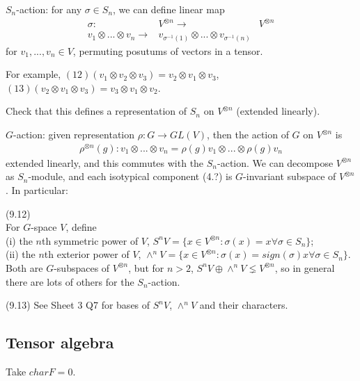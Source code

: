 \documentclass[a4paper]{article}
\begin{document}
$S_n$-action: for any $\sigma \in S_n$, we can define linear map
\begin{equation*}
\begin{aligned}
\sigma: &V^{\otimes n} \to &V^{\otimes n}\\
v_1 \otimes ... \otimes v_n \to &v_{\sigma^{-1}(1)} \otimes ... \otimes v_{\sigma^{-1}(n)}
\end{aligned}
\end{equation*}
for $v_1,...,v_n \in V$, permuting posutums of vectors in a tensor.

For example, $(12)(v_1\otimes v_2 \otimes v_3) = v_2 \otimes v_1 \otimes v_3$, $(13)(v_2 \otimes v_1 \otimes v_3) = v_3 \otimes v_1 \otimes v_2$.

Check that this defines a representation of $S_n$ on $V^{\otimes n}$ (extended linearly).

$G$-action: given representation $\rho:G \to GL(V)$, then the action of $G$ on $V^{\otimes n}$ is
\begin{equation*}
\begin{aligned}
\rho^{\otimes n} (g) : v_1 \otimes ... \otimes v_n = \rho(g) v_1 \otimes ... \otimes \rho(g) v_n
\end{aligned}
\end{equation*}
extended linearly, and this commutes with the $S_n$-action. We can decompose $V^{\otimes n}$ as $S_n$-module, and each isotypical component (4.?) is $G$-invariant subspace of $V^{\otimes n}$. In particular:

\begin{defi} (9.12)\\
For $G$-space $V$, define\\
(i) the $n$th symmetric power of $V$, $S^n V = \{x \in V^{\otimes n}: \sigma(x) = x \forall \sigma \in S_n\}$;\\
(ii) the $n$th exterior power of $V$, $\wedge^n V = \{x \in V^{\otimes n}: \sigma(x) = sign(\sigma)x \forall \sigma \in S_n\}$.\\
Both are $G$-subspaces of $V^{\otimes n}$, but for $n>2$, $S^n V \oplus \wedge^n V \lneq V^{\otimes n}$, so in general there are lots of others for the $S_n$-action.
\end{defi}

(9.13) See Sheet 3 Q7 for bases of $S^n V$, $\wedge^n V$ and their characters.

\subsection{Tensor algebra}
Take $char F = 0$.
\end{document}
